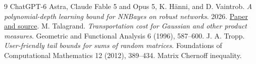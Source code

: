 \documentclass[11pt]{article}
\begin{document}


\appendix


\begin{thebibliography}{9}
 ChatGPT-6 Astra, Claude Fable 5 and Opus 5, K. H\"anni,
and D. Vaintrob. \emph{A polynomial-depth learning bound for NNBayes on
robust networks}. 2026.
\href{https://github.com/kaarelh/AI-works/tree/main/neural-network-generalization/main-results/robust-polynomial-depth}{Paper and source}.
 M. Talagrand. \emph{Transportation cost for Gaussian
and other product measures}. Geometric and Functional Analysis 6 (1996),
587--600.
 J. A. Tropp. \emph{User-friendly tail bounds for sums of
random matrices}. Foundations of Computational Mathematics 12 (2012),
389--434. Matrix Chernoff inequality.
\end{thebibliography}
\end{document}
